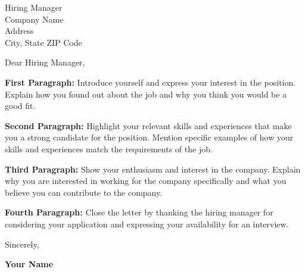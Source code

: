 \documentclass{letter}
\begin{document}
\begin{letter}{Hiring Manager\\
Company Name\\
Address\\
City, State ZIP Code}

\date{January 2023}

\opening{Dear Hiring Manager,}

\textbf{First Paragraph: } Introduce yourself and express your interest in the position. Explain how you found out about the job and why you think you would be a good fit.

\textbf{Second Paragraph:} Highlight your relevant skills and experiences that make you a strong candidate for the position. Mention specific examples of how your skills and experiences match the requirements of the job.

\textbf{Third Paragraph:} Show your enthusiasm and interest in the company. Explain why you are interested in working for the company specifically and what you believe you can contribute to the company.

\textbf{Fourth Paragraph:} Close the letter by thanking the hiring manager for considering your application and expressing your availability for an interview.

\closing{Sincerely,}

\textbf{Your Name}

\end{letter}
\end{document}
